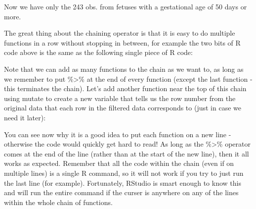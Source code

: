 \documentclass[
]{article}
\newenvironment{Shaded}{\begin{snugshade}}{\end{snugshade}}
\newcommand{\DataTypeTok}[1]{\textcolor[rgb]{0.13,0.29,0.53}{#1}}
\newcommand{\DecValTok}[1]{\textcolor[rgb]{0.00,0.00,0.81}{#1}}
\newcommand{\KeywordTok}[1]{\textcolor[rgb]{0.13,0.29,0.53}{\textbf{#1}}}
\newcommand{\NormalTok}[1]{#1}
\newcommand{\OperatorTok}[1]{\textcolor[rgb]{0.81,0.36,0.00}{\textbf{#1}}}
\newcommand{\StringTok}[1]{\textcolor[rgb]{0.31,0.60,0.02}{#1}}
\begin{document}
Now we have only the 243 obs. from fetuses with a gestational age of 50
days or more.

The great thing about the chaining operator is that it is easy to do
multiple functions in a row without stopping in between, for example the
two bits of R code above is the same as the following single piece of R
code:

\begin{Shaded}
\end{Shaded}

Note that we can add as many functions to the chain as we want to, as
long as we remember to put \%\textgreater\% at the end of every function
(except the last function - this terminates the chain). Let's add
another function near the top of this chain using mutate to create a new
variable that tells us the row number from the original data that each
row in the filtered data corresponds to (just in case we need it later):

\begin{Shaded}
\end{Shaded}

You can see now why it is a good idea to put each function on a new line
- otherwise the code would quickly get hard to read! As long as the
\%\textgreater\% operator comes at the end of the line (rather than at
the start of the new line), then it all works as expected. Remember that
all the code within the chain (even if on multiple lines) is a single R
command, so it will not work if you try to just run the last line (for
example). Fortunately, RStudio is smart enough to know this and will run
the entire command if the curser is anywhere on any of the lines within
the whole chain of functions.
\end{document}
